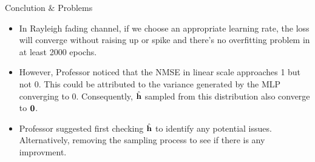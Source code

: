 \documentclass[hyperref={bookmarks=false}]{beamer}
\numberwithin{figure}{section}
\begin{document}
\begin{frame}{Conclution $\&$ Problems}
\begin{itemize}
  \item In Rayleigh fading channel, if we choose an appropriate learning 
    rate, the loss will converge without raising up or spike and there's 
    no overfitting problem in at least 2000 epochs.
  \vspace{12pt}
  \item However, Professor noticed that the NMSE in linear scale approaches
    1 but not 0. This could be attributed to the variance generated by the 
    MLP converging to 0. Consequently, $\hat{{\bf h}}$ sampled from this 
    distribution also converge to ${\bf 0}$.
  \item Professor suggested first checking $\hat{{\bf h}}$ to identify any 
    potential issues. Alternatively, removing the sampling process to see 
    if there is any improvment.

\end{itemize}
\end{frame}
\end{document}
